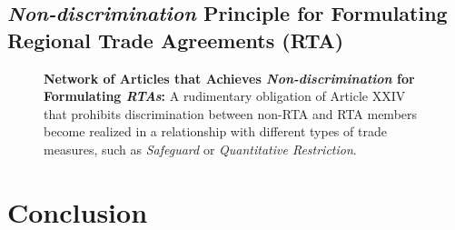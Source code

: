 \documentclass[12pt,letterpaper]{article}
\begin{document}
\subsection{\textit{Non-discrimination} Principle for Formulating Regional Trade Agreements (RTA)}  %

\begin{figure}[ht]
  \centering{
    
  }
  \caption{{\bf Network of Articles that Achieves \textit{Non-discrimination} for Formulating \textit{RTAs}:}
    A rudimentary obligation of Article XXIV that prohibits discrimination between non-RTA and RTA members become realized in a relationship with
    different types of trade measures, such as \textit{Safeguard} or \textit{Quantitative Restriction}.
  }
  \label{fig:rta-explained}
\end{figure}






% 

% 

\section{Conclusion}
\end{document}
